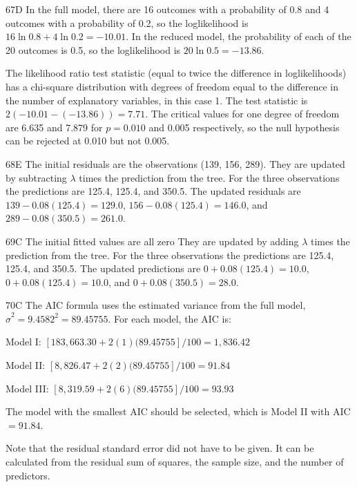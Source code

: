 \begin{solution}{67}{D}
In the full model, there are 16 outcomes with a probability of 0.8 and 4 outcomes with a probability of 0.2, so the loglikelihood is $16 \ln 0.8 + 4 \ln 0.2 = -10.01$. In the reduced model, the probability of each of the 20 outcomes is 0.5, so the loglikelihood is $20 \ln 0.5 = -13.86$.

The likelihood ratio test statistic (equal to twice the difference in loglikelihoods) has a chi-square distribution with degrees of freedom equal to the difference in the number of explanatory variables, in this case 1. The test statistic is $2(-10.01 - (-13.86)) = 7.71$. The critical values for one degree of freedom are 6.635 and 7.879 for $p = 0.010$ and 0.005 respectively, so the null hypothesis can be rejected at 0.010 but not 0.005.
\end{solution}

\begin{solution}{68}{E}
The initial residuals are the observations (139, 156, 289). They are updated by subtracting $\lambda$ times the prediction from the tree. For the three observations the predictions are 125.4, 125.4, and 350.5. The updated residuals are $139 - 0.08(125.4) = 129.0$, $156 - 0.08(125.4) = 146.0$, and $289 - 0.08(350.5) = 261.0$.
\end{solution}

\begin{solution}{69}{C}
The initial fitted values are all zero They are updated by adding $\lambda$ times the prediction from the tree. For the three observations the predictions are 125.4, 125.4, and 350.5. The updated predictions are $0 + 0.08(125.4) = 10.0$, $0 + 0.08(125.4) = 10.0$, and $0 + 0.08(350.5) = 28.0$.
\end{solution}

\begin{solution}{70}{C}
The AIC formula uses the estimated variance from the full model, $\hat{\sigma}^2 = 9.4582^2 = 89.45755$. For each model, the AIC is:

Model I: $[183{,}663.30 + 2(1)(89.45755]/100 = 1{,}836.42$

Model II: $[8{,}826.47 + 2(2)(89.45755]/100 = 91.84$

Model III: $[8{,}319.59 + 2(6)(89.45755]/100 = 93.93$

The model with the smallest AIC should be selected, which is Model II with AIC $= 91.84$.

Note that the residual standard error did not have to be given. It can be calculated from the residual sum of squares, the sample size, and the number of predictors.
\end{solution}

